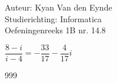 \documentclass[a4paper]{article}
\begin{document}
  
\noindent \large Auteur: Kyan Van den Eynde \\
\noindent \large Studierichting: Informatica\\
\noindent \large Oefeningenreeks 1B nr. 14.8\\

\medskip

\normalsize

$\dfrac{8-i}{i-4} = -\dfrac{33}{17}-\dfrac{4}{17}i$\\

\begin{thebibliography}{999}
\end{thebibliography}
\end{document}

